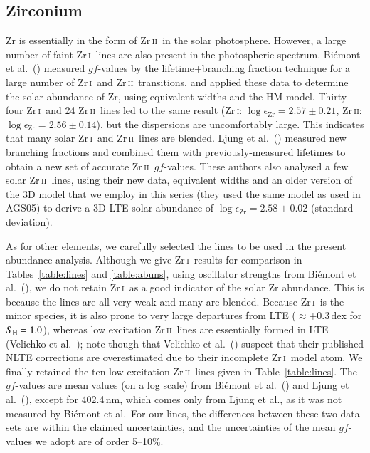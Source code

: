 \documentclass[traditabstract]{aa}
\newcommand{\altzri}{Zr\,\textsc{i}}
\newcommand{\altzrii}{Zr\,\textsc{ii}}
\newcommand{\zri}{\altzri\ }
\newcommand{\zrii}{\altzrii\ }
\begin{document}
\subsection{Zirconium}
Zr is essentially in the form of \zrii in the solar photosphere.  However, a
large number of faint \zri lines are also present in the photospheric
spectrum.  Bi\'emont et al.\ (\cite{biem3}) measured $gf$-values by the
lifetime+branching fraction technique for a large number of \zri and
\zrii transitions, and applied these data to determine the solar
abundance of Zr, using equivalent widths and the HM model. Thirty-four \zri and 24 \zrii lines
led to the same result (\altzri: $\log\epsilon_{\mathrm{Zr}}= 2.57\pm0.21$, \altzrii: $\log\epsilon_{\mathrm{Zr}}= 2.56\pm0.14$), but the dispersions are uncomfortably large. 
This indicates that many solar \zri and \zrii lines are blended.
Ljung et al.\ (\cite{ljung}) measured new branching fractions and combined 
them with previously-measured lifetimes to obtain a new set of accurate \zrii $gf$-values. 
These authors also analysed a few solar \zrii lines, using their new data, equivalent widths and an older version of the 3D model that we employ in this series (they used the same model as used in AGS05) to derive a 3D LTE solar abundance of $\log\epsilon_{\mathrm{Zr}}= 2.58\pm0.02$ (standard deviation). 

As for other elements, we carefully selected the lines to be used in the
present abundance analysis. Although we give \zri results for comparison in Tables~\ref{table:lines} 
and \ref{table:abuns}, using oscillator strengths from Bi\'emont et al.\ (\cite{biem3}), we do not retain \zri as a good indicator
of the solar Zr abundance.  This is because the lines are all very weak and many are blended.  Because \zri is the minor species, 
it is also prone to very large departures from LTE (\mbox{$\approx +0.3$}\,dex for $S_{\rm H}=1.0$), whereas low excitation \zrii lines are essentially formed in LTE (Velichko et al.\ \cite{veli}); note though that Velichko et al.\ (\cite{veli2}) suspect that their published NLTE corrections are overestimated due to their incomplete \zri model atom.  We finally retained the ten low-excitation \zrii lines given in Table~\ref{table:lines}. The $gf$-values are mean values (on a log scale) from Bi\'emont et al.\ (\cite{biem3}) and Ljung et al.\ (\cite{ljung}), except for 402.4\,nm, which comes only from Ljung et al., as it was not measured by Bi\'emont et al.\  For our lines, the differences between these two data sets are within the claimed uncertainties, and the uncertainties of the mean $gf$-values we adopt are of order 5--10$\%$.
\end{document}
